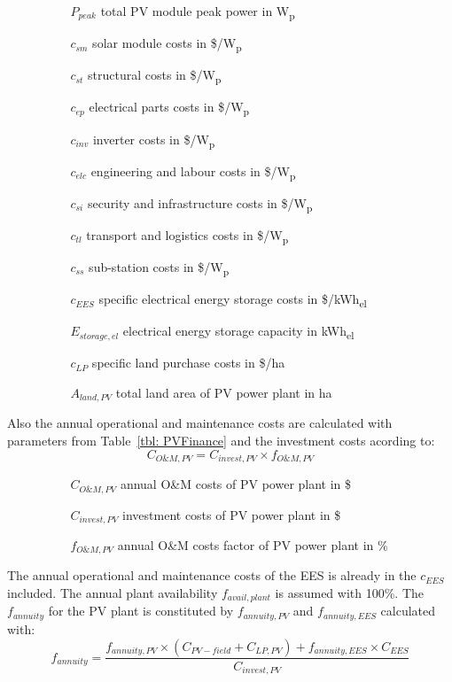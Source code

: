 \begin{itemize}
\item[ ] 
\begin{itemize}
\item[ ] 
\begin{itemize}
\item[$P_{peak}$]total PV module peak power in W\textsubscript{p}
\item[$c_{sm}$]solar module costs in \$/W\textsubscript{p}
\item[$c_{st}$]structural costs in \$/W\textsubscript{p}
\item[$c_{ep}$]electrical parts costs in \$/W\textsubscript{p}
\item[$c_{inv}$]inverter costs in \$/W\textsubscript{p}
\item[$c_{elc}$]engineering and labour costs in \$/W\textsubscript{p}
\item[$c_{si}$]security and infrastructure costs in \$/W\textsubscript{p}
\item[$c_{tl}$]transport and logistics costs in \$/W\textsubscript{p}
\item[$c_{ss}$]sub-station costs in \$/W\textsubscript{p}
\item[$c_{EES}$]specific electrical energy storage costs in \$/kWh\textsubscript{el}
\item[$E_{storage,el}$]electrical energy storage capacity in kWh\textsubscript{el}
\item[$c_{LP}$]specific land purchase costs in \$/ha
\item[$A_{land,PV}$]total land area of PV power plant in ha
\end{itemize}
\end{itemize}
\end{itemize}
Also the annual operational and maintenance costs are calculated with parameters from Table~\ref{tbl: PVFinance} and the investment costs acording to:
\begin{equation}
C_{O\&M,PV} = C_{invest,PV} \times f_{O\&M,PV}
\end{equation} 
\begin{itemize}
\item[ ] 
\begin{itemize}
\item[ ] 
\begin{itemize}
\item[$C_{O\&M,PV}$]annual O\&M costs of PV power plant in \$
\item[$C_{invest,PV}$]investment costs of PV power plant in \$
\item[$f_{O\&M,PV}$]annual O\&M costs factor of PV power plant in \%
\end{itemize}
\end{itemize}
\end{itemize}
The annual operational and maintenance costs of the EES is already in the $c_{EES}$ included. The annual plant availability $f_{avail,plant}$ is assumed with 100\%. The $f_{annuity}$ for the PV plant is constituted by $f_{annuity,PV}$ and $f_{annuity,EES}$  calculated with:
\begin{equation}
f_{annuity}=\frac{f_{annuity,PV}\times(C_{PV-field}+C_{LP,PV})+ f_{annuity,EES}\times C_{EES}}{C_{invest,PV}}
\end{equation}

\pagebreak
